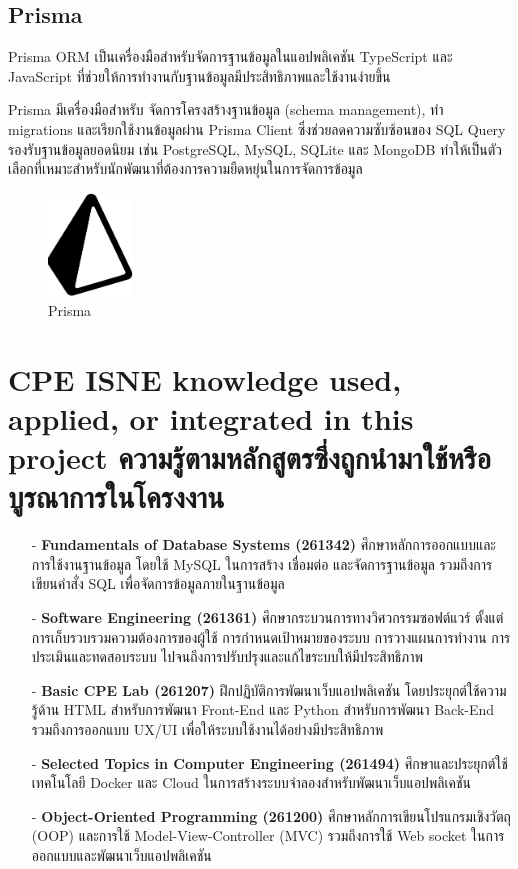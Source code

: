 \subsection{Prisma}
Prisma ORM เป็นเครื่องมือสำหรับจัดการฐานข้อมูลในแอปพลิเคชัน TypeScript และ JavaScript ที่ช่วยให้การทำงานกับฐานข้อมูลมีประสิทธิภาพและใช้งานง่ายขึ้น

Prisma มีเครื่องมือสำหรับ จัดการโครงสร้างฐานข้อมูล (schema management), ทำ migrations และเรียกใช้งานข้อมูลผ่าน Prisma Client ซึ่งช่วยลดความซับซ้อนของ SQL Query รองรับฐานข้อมูลยอดนิยม เช่น PostgreSQL, MySQL, SQLite และ MongoDB ทำให้เป็นตัวเลือกที่เหมาะสำหรับนักพัฒนาที่ต้องการความยืดหยุ่นในการจัดการข้อมูล \cite{aiw9}
\begin{figure}[H]
  \begin{center}
  \includegraphics[width=0.2\textwidth]{pngwing.com (3).png}
  \end{center}
  \caption[Prisma]{Prisma}
\end{figure}

\newpage

\section{\ifenglish%
\ifcpe CPE \else ISNE \fi knowledge used, applied, or integrated in this project
\else%
ความรู้ตามหลักสูตรซึ่งถูกนำมาใช้หรือบูรณาการในโครงงาน
\fi
}
\begin{itemize}

  \item[-] \textbf{Fundamentals of Database Systems (261342)} ศึกษาหลักการออกแบบและการใช้งานฐานข้อมูล โดยใช้ MySQL ในการสร้าง เชื่อมต่อ และจัดการฐานข้อมูล รวมถึงการเขียนคำสั่ง SQL เพื่อจัดการข้อมูลภายในฐานข้อมูล
  \item[-] \textbf{Software Engineering (261361)} ศึกษากระบวนการทางวิศวกรรมซอฟต์แวร์ ตั้งแต่การเก็บรวบรวมความต้องการของผู้ใช้ การกำหนดเป้าหมายของระบบ การวางแผนการทำงาน การประเมินและทดสอบระบบ ไปจนถึงการปรับปรุงและแก้ไขระบบให้มีประสิทธิภาพ
  \item[-] \textbf{Basic CPE Lab (261207)} ฝึกปฏิบัติการพัฒนาเว็บแอปพลิเคชัน โดยประยุกต์ใช้ความรู้ด้าน HTML สำหรับการพัฒนา Front-End และ Python สำหรับการพัฒนา Back-End รวมถึงการออกแบบ UX/UI เพื่อให้ระบบใช้งานได้อย่างมีประสิทธิภาพ
  \item[-] \textbf{Selected Topics in Computer Engineering (261494)} ศึกษาและประยุกต์ใช้เทคโนโลยี Docker และ Cloud ในการสร้างระบบจำลองสำหรับพัฒนาเว็บแอปพลิเคชัน
  \item[-] \textbf{Object-Oriented Programming (261200)} ศึกษาหลักการเขียนโปรแกรมเชิงวัตถุ (OOP) และการใช้ Model-View-Controller (MVC) รวมถึงการใช้ Web socket ในการออกแบบและพัฒนาเว็บแอปพลิเคชัน

\end{itemize}

